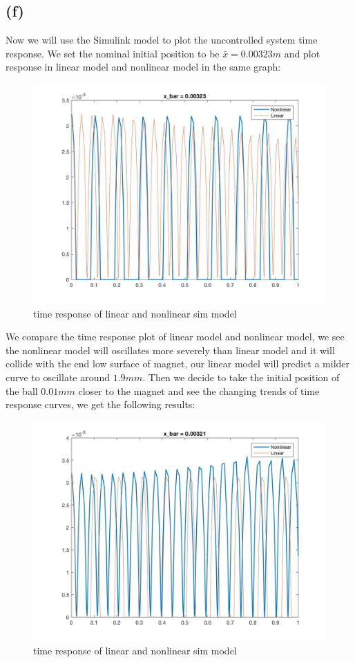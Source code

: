 \documentclass[letterpaper]{article}
\begin{document}
\subsection*{(f)}
Now we will use the Simulink model to plot the uncontrolled system time response. We set the nominal initial position to be $\bar{x} = 0.00323 m$ and plot response in linear model and nonlinear model in the same graph:
\begin{figure}[H]
	\centering
	\includegraphics[scale=0.2]{X_BAR323_nocontrol.jpg}
	\caption{time response of linear and nonlinear sim model}
\end{figure}
We compare the time response plot of linear model and nonlinear model, we see the nonlinear model will oscillates more severely than linear model and it will collide with the end low surface of magnet, our linear model will predict a milder curve to oscillate around $1.9 mm$. Then we decide to take the initial position of the ball $0.01 mm$ closer to the magnet and see the changing trends of time response curves, we get the following results:
\begin{figure}[H]
	\centering
	\includegraphics[scale=0.2]{X_BAR322_nocontrol.jpg}
	\caption{time response of linear and nonlinear sim model}
\end{figure}
\end{document}
